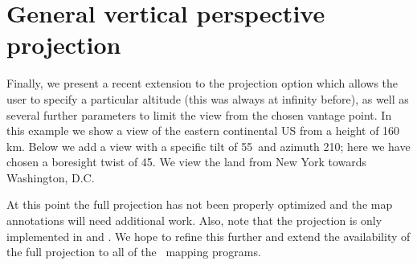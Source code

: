 
\section{General vertical perspective projection}

Finally, we present a recent extension to the  projection option which allows the user
to specify a particular altitude (this was always at infinity before), as well as several
further parameters to limit the view from the chosen vantage point.  In this example we show
a view of the eastern continental US from a height of 160 km.  Below we add a view with a specific tilt of
55\DS\ and azimuth 210\DS; here we have chosen a boresight twist of 45\DS.  We view the land from
New York towards Washington, D.C.


At this point the full projection has not been properly optimized and the map annotations will need
additional work.  Also, note that the projection is only implemented in  and .
We hope to refine this further and extend the availability of the full projection to all of the
\GMT\ mapping programs.

 
